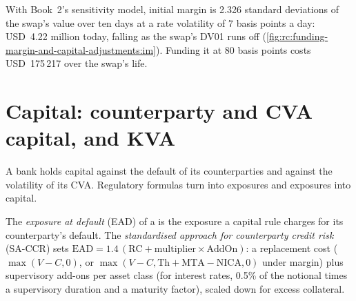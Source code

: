 \begin{example}\label{ex:rc:funding-margin-and-capital-adjustments:mva}
With Book~2's sensitivity model, initial margin is 2.326 standard deviations of the swap's
value over ten days at a rate volatility of 7 basis points a day: USD~4.22 million today,
falling as the swap's DV01 runs off (\cref{fig:rc:funding-margin-and-capital-adjustments:im}).
Funding it at 80 basis points costs USD~175\,217 over the swap's life.
\end{example}

\begin{omfigure}

\label{fig:rc:funding-margin-and-capital-adjustments:im}
\end{omfigure}

\section{Capital: counterparty and CVA capital, and KVA}

A bank holds capital against the default of its counterparties and against the volatility
of its CVA. Regulatory formulas turn  into exposures and exposures into capital.

\begin{definition}\label{def:rc:funding-margin-and-capital-adjustments:saccr}
The \emph{exposure at default} (EAD) of a  is the
exposure a capital rule charges for its counterparty's default. The \emph{standardised
approach for counterparty credit risk}
(SA-CCR) sets $\mathrm{EAD} = 1.4\,(\mathrm{RC}+\mathrm{multiplier}\times\mathrm{AddOn})$: a replacement cost
($\max(V-C,0)$, or $\max(V-C,\mathrm{Th}+\mathrm{MTA}-\mathrm{NICA},0)$ under margin) plus supervisory add-ons
per asset class (for interest rates, 0.5\% of the notional times a supervisory duration and a
maturity factor), scaled down for excess collateral.
\end{definition}

